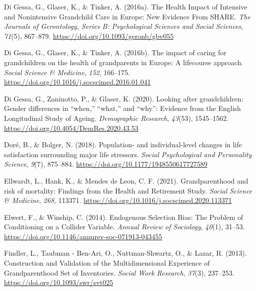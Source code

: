 \documentclass[
  english,
  man, noextraspace]{apa7}
\begin{document}
\leavevmode\hypertarget{ref-digessaHealthImpactIntensive2016}{}%
Di Gessa, G., Glaser, K., \& Tinker, A. (2016a). The Health Impact of Intensive and Nonintensive Grandchild Care in Europe: New Evidence From SHARE. \emph{The Journals of Gerontology, Series B: Psychological Sciences and Social Sciences}, \emph{71}(5), 867--879. \url{https://doi.org/10.1093/geronb/gbv055}

\leavevmode\hypertarget{ref-digessaImpactCaringGrandchildren2016}{}%
Di Gessa, G., Glaser, K., \& Tinker, A. (2016b). The impact of caring for grandchildren on the health of grandparents in Europe: A lifecourse approach. \emph{Social Science \& Medicine}, \emph{152}, 166--175. \url{https://doi.org/10.1016/j.socscimed.2016.01.041}

\leavevmode\hypertarget{ref-digessaLookingGrandchildrenGender2020}{}%
Di Gessa, G., Zaninotto, P., \& Glaser, K. (2020). Looking after grandchildren: Gender differences in ``when,'' ``what,'' and ``why'': Evidence from the English Longitudinal Study of Ageing. \emph{Demographic Research}, \emph{43}(53), 1545--1562. \url{https://doi.org/10.4054/DemRes.2020.43.53}

\leavevmode\hypertarget{ref-dorePopulationIndividuallevelChanges2018}{}%
Doré, B., \& Bolger, N. (2018). Population- and individual-level changes in life satisfaction surrounding major life stressors. \emph{Social Psychological and Personality Science}, \emph{9}(7), 875--884. \url{https://doi.org/10.1177/1948550617727589}

\leavevmode\hypertarget{ref-ellwardtGrandparenthoodRiskMortality2021}{}%
Ellwardt, L., Hank, K., \& Mendes de Leon, C. F. (2021). Grandparenthood and risk of mortality: Findings from the Health and Retirement Study. \emph{Social Science \& Medicine}, \emph{268}, 113371. \url{https://doi.org/10.1016/j.socscimed.2020.113371}

\leavevmode\hypertarget{ref-elwertEndogenousSelectionBias2014}{}%
Elwert, F., \& Winship, C. (2014). Endogenous Selection Bias: The Problem of Conditioning on a Collider Variable. \emph{Annual Review of Sociology}, \emph{40}(1), 31--53. \url{https://doi.org/10.1146/annurev-soc-071913-043455}

\leavevmode\hypertarget{ref-findlerConstructionValidationMultidimensional2013}{}%
Findler, L., Taubman - Ben-Ari, O., Nuttman-Shwartz, O., \& Lazar, R. (2013). Construction and Validation of the Multidimensional Experience of Grandparenthood Set of Inventories. \emph{Social Work Research}, \emph{37}(3), 237--253. \url{https://doi.org/10.1093/swr/svt025}
\end{document}
